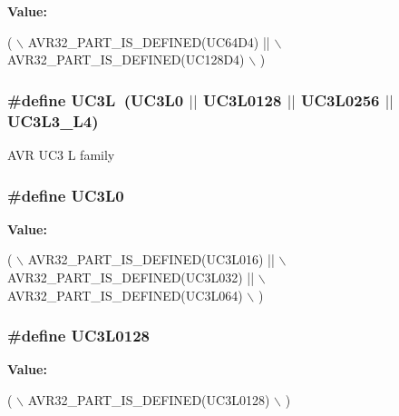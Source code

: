 {\bfseries Value\-:}
\begin{DoxyCode}
(       \(\backslash\)
                AVR32\_PART\_IS\_DEFINED(UC64D4)  || \(\backslash\)
                AVR32\_PART\_IS\_DEFINED(UC128D4) \(\backslash\)
                )
\end{DoxyCode}
\hypertarget{group__uc3__part__macros__group_gac8a7d715e500aa74cd05e0f0fc5bb005}{
\subsubsection[{U\-C3\-L}]{\setlength{\rightskip}{0pt plus 5cm}\#define U\-C3\-L~(U\-C3\-L0 $|$$|$ U\-C3\-L0128 $|$$|$ U\-C3\-L0256 $|$$|$ U\-C3\-L3\-\_\-\-L4)}}\label{group__uc3__part__macros__group_gac8a7d715e500aa74cd05e0f0fc5bb005}
A\-V\-R U\-C3 L family \hypertarget{group__uc3__part__macros__group_ga4a399e061cd2bf1088c01a22f69cf6c1}{
\subsubsection[{U\-C3\-L0}]{\setlength{\rightskip}{0pt plus 5cm}\#define U\-C3\-L0}}\label{group__uc3__part__macros__group_ga4a399e061cd2bf1088c01a22f69cf6c1}
{\bfseries Value\-:}
\begin{DoxyCode}
(       \(\backslash\)
                AVR32\_PART\_IS\_DEFINED(UC3L016) || \(\backslash\)
                AVR32\_PART\_IS\_DEFINED(UC3L032) || \(\backslash\)
                AVR32\_PART\_IS\_DEFINED(UC3L064) \(\backslash\)
                )
\end{DoxyCode}
\hypertarget{group__uc3__part__macros__group_ga2acf2e6f59e322e343123ad12fe89c2c}{
\subsubsection[{U\-C3\-L0128}]{\setlength{\rightskip}{0pt plus 5cm}\#define U\-C3\-L0128}}\label{group__uc3__part__macros__group_ga2acf2e6f59e322e343123ad12fe89c2c}
{\bfseries Value\-:}
\begin{DoxyCode}
( \(\backslash\)
                AVR32\_PART\_IS\_DEFINED(UC3L0128) \(\backslash\)
                )
\end{DoxyCode}
